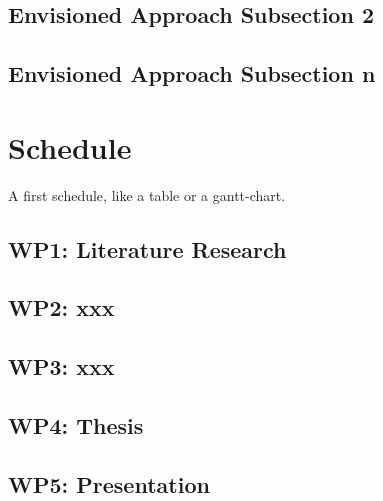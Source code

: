   \section{Envisioned Approach Subsection 2}
    \blindtext
  \section{Envisioned Approach Subsection n}
    \blindtext


\chapter{Schedule}\label{chp:Schedule}
  A first schedule, like a table or a gantt-chart.
  \section{WP1: Literature Research}
  	\blindtext
  \section{WP2: xxx}
	\blindtext
  \section{WP3: xxx}
    \blindtext
  \section{WP4: Thesis}
    \blindtext
  \section{WP5: Presentation}
	\blindtext

